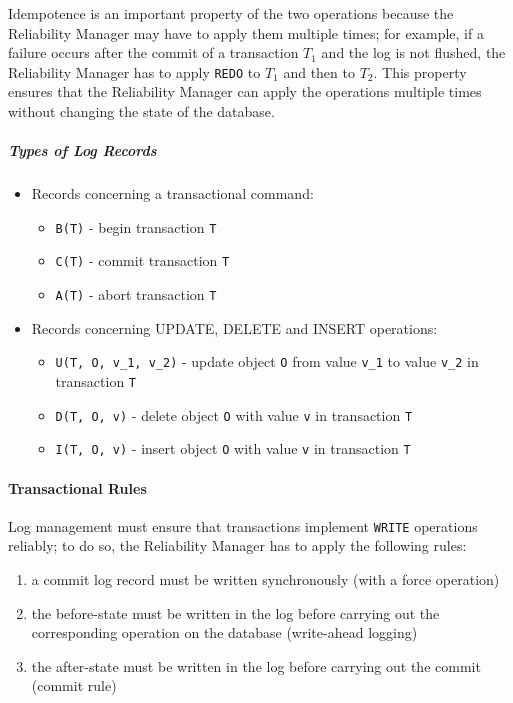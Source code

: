 \documentclass[english]{article}
\begin{document}
Idempotence is an important property of the two operations because the Reliability Manager may have to apply them multiple times;
for example, if a failure occurs after the commit of a transaction \(T_1\) and the log is not flushed, the Reliability Manager has to apply \texttt{REDO} to \(T_1\) and then to \(T_2\).
This property ensures that the Reliability Manager can apply the operations multiple times without changing the state of the database.

\subparagraph*{Types of Log Records}

\begin{itemize}
  \item Records concerning a transactional command:
        \begin{itemize}[label=\texttt{>}]
          \item \texttt{B(T)} - begin transaction \texttt{T}
          \item \texttt{C(T)} - commit transaction \texttt{T}
          \item \texttt{A(T)} - abort transaction \texttt{T}
        \end{itemize}
  \item Records concerning UPDATE, DELETE and INSERT operations:
        \begin{itemize}
          \item \texttt{U(T, O, v\_1, v\_2)} - update object \texttt{O} from value \texttt{v\_1} to value \texttt{v\_2} in transaction \texttt{T}
          \item \texttt{D(T, O, v)} - delete object \texttt{O} with value \texttt{v} in transaction \texttt{T}
          \item \texttt{I(T, O, v)} - insert object \texttt{O} with value \texttt{v} in transaction \texttt{T}
        \end{itemize}
\end{itemize}

\paragraph{Transactional Rules}

Log management must ensure that transactions implement \texttt{WRITE} operations reliably;
to do so, the Reliability Manager has to apply the following rules:

\begin{enumerate}
  \item\label{enum:transactional-rules-1} a commit log record must be written synchronously (with a force operation)
  \item\label{enum:transactional-rules-2} the before-state must be written in the log before carrying out the corresponding operation on the database (write-ahead logging)
  \item\label{enum:transactional-rules-3} the after-state must be written in the log before carrying out the commit (commit rule)
\end{enumerate}
\end{document}

